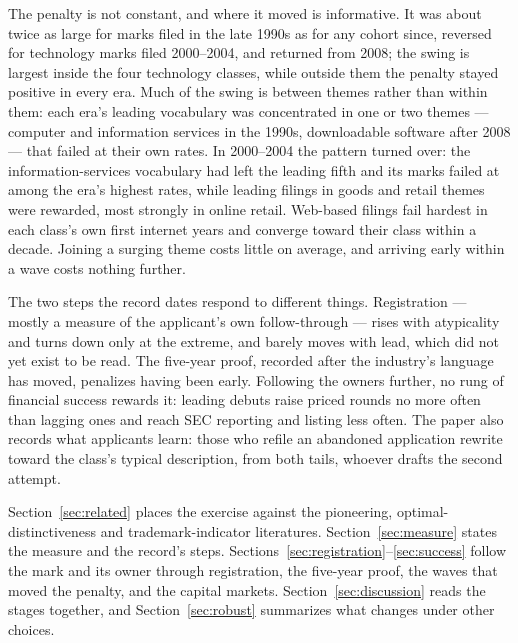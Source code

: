 The penalty is not constant, and where it moved is informative. It was
about twice as large for marks filed in the late 1990s as for any cohort
since, reversed for technology marks filed 2000--2004, and returned from
2008; the swing is largest inside the four technology classes, while
outside them the penalty stayed positive in every era. Much of the swing
is between themes rather than within them: each era's leading vocabulary
was concentrated in one or two themes --- computer and information
services in the 1990s, downloadable software after 2008 --- that failed
at their own rates. In 2000--2004 the pattern turned over: the
information-services vocabulary had left the leading fifth and its marks
failed at among the era's highest rates, while leading filings in goods
and retail themes were rewarded, most strongly in online retail.
Web-based filings fail hardest in each class's own first internet years
and converge toward their class within a decade. Joining a surging theme
costs little on average, and arriving early within a wave costs nothing
further.

The two steps the record dates respond to different things. Registration
--- mostly a measure of the applicant's own follow-through --- rises with
atypicality and turns down only at the extreme, and barely moves with
lead, which did not yet exist to be read. The five-year proof, recorded
after the industry's language has moved, penalizes having been early.
Following the owners further, no rung of financial success rewards it:
leading debuts raise priced rounds no more often than lagging ones and
reach SEC reporting and listing less often. The paper also records what
applicants learn: those who refile an abandoned application rewrite
toward the class's typical description, from both tails, whoever drafts
the second attempt.

Section~\ref{sec:related} places the exercise against the pioneering,
optimal-distinctiveness and trademark-indicator literatures.
Section~\ref{sec:measure} states the measure and the record's steps.
Sections~\ref{sec:registration}--\ref{sec:success} follow the mark and
its owner through registration, the five-year proof, the waves that moved
the penalty, and the capital markets. Section~\ref{sec:discussion} reads
the stages together, and Section~\ref{sec:robust} summarizes what
changes under other choices.
